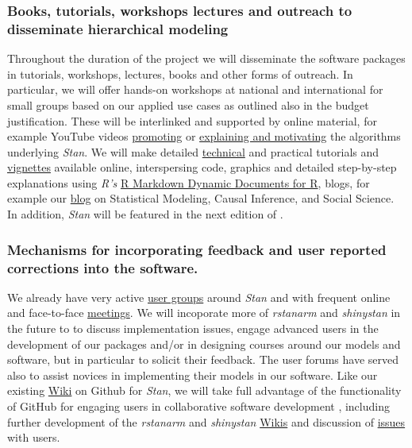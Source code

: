 \documentclass[11pt,notitlepage]{article}
\begin{document}
\subsubsection*{Books, tutorials, workshops lectures and outreach to disseminate hierarchical modeling}
Throughout the duration of the project we will disseminate the software packages in tutorials, workshops, lectures, books and other forms 
of outreach. In particular, we will offer hands-on workshops at national and international for small groups based on our applied use cases 
as outlined also in the budget justification. These will be interlinked and supported by online material, for 
example YouTube videos \href{https://www.youtube.com/watch?v=pWow8Qe1snQ}{promoting} or 
\href{https://www.youtube.com/watch?v=pHsuIaPbNbY}{explaining and motivating} the algorithms underlying \textit{Stan}. We will make 
detailed \href{http://mc-stan.org/documentation/}{technical} and practical tutorials and 
\href{https://cran.r-project.org/web/packages/rstanarm/vignettes/aov.html}{vignettes} available online, interspersing code, graphics 
and detailed step-by-step explanations using \textit{R's}  \href{http://rmarkdown.rstudio.com/}{R Markdown \- Dynamic Documents for R}, 
blogs, for example our \href{http://andrewgelman.com/}{blog} on Statistical Modeling, Causal Inference, and Social Science. In addition, 
\textit{Stan} will be featured in the next edition of \cite{Gelman-Hill_2014}.

\subsubsection*{Mechanisms for incorporating feedback and user reported corrections into the software.}

We already have very active \href{https://groups.google.com/forum/#!forum/stan-users} {user groups} around \textit{Stan} and 
with frequent online and face-to-face \href{http://www.meetup.com/bda-group/}{meetings}. We will incoporate more of
\textit{rstanarm} and \textit{shinystan} in the future to to discuss implementation issues, engage advanced users in the development of 
our packages and/or in designing courses around our models and software, but in particular to solicit their feedback. The user 
forums have served also to assist novices in implementing their models in our software.
Like our existing \href{https://github.com/stan-dev/example-models/wiki}{Wiki} on Github for \textit{Stan}, we will 
take full advantage of the functionality of GitHub for engaging users in collaborative software development \cite{loeliger2012version}, 
including further development of the \textit{rstanarm} and \textit{shinystan} 
\href{https://github.com/stan-dev/rstanarm/wiki}{Wikis} and discussion of \href{https://github.com/stan-dev/rstanarm/issues}{issues} with users.
\end{document}
